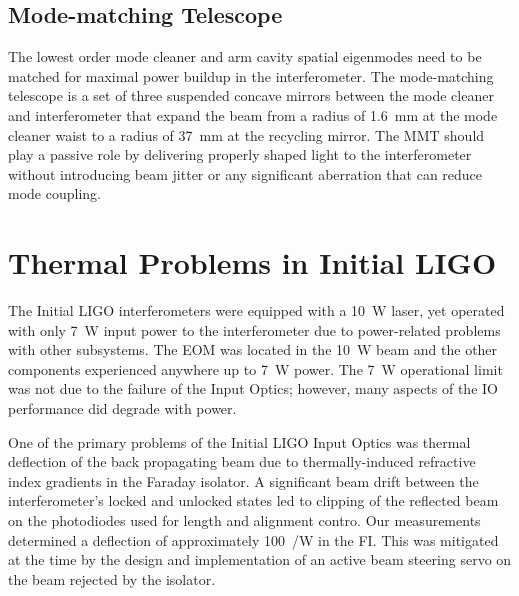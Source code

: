 \subsection{Mode-matching Telescope}
The lowest order mode cleaner and arm cavity spatial eigenmodes need
to be matched for maximal power buildup in the interferometer. The
mode-matching telescope is a set of three suspended concave mirrors
between the mode cleaner and interferometer that expand the beam from
a radius of 1.6~mm at the mode cleaner waist to a radius of 37~mm at
the recycling mirror.  The MMT should play a passive role by
delivering properly shaped light to the interferometer without
introducing beam jitter or any significant aberration that can reduce
mode coupling.




\section{Thermal Problems in Initial LIGO}
\label{sec:problems}
The Initial LIGO interferometers were equipped with a 10~W laser, yet
operated with only 7~W input power to the interferometer due to
power-related problems with other subsystems. The EOM was located in
the 10~W beam and the other components experienced anywhere up to 7~W
power. The 7~W operational limit was not due to the failure of the
Input Optics; however, many aspects of the IO performance did degrade
with power.

One of the primary problems of the Initial LIGO Input Optics
\citep{Adhikari1998Input} was thermal deflection of the back
propagating beam due to thermally-induced refractive index gradients
in the Faraday isolator. A significant beam drift between the
interferometer's locked and unlocked states led to clipping of the
reflected beam on the photodiodes used for length and alignment
contro. Our measurements determined a deflection of approximately
100~\microrad/W in the FI.  This was mitigated at the time by the
design and implementation of an active beam steering servo on the beam
rejected by the isolator.

